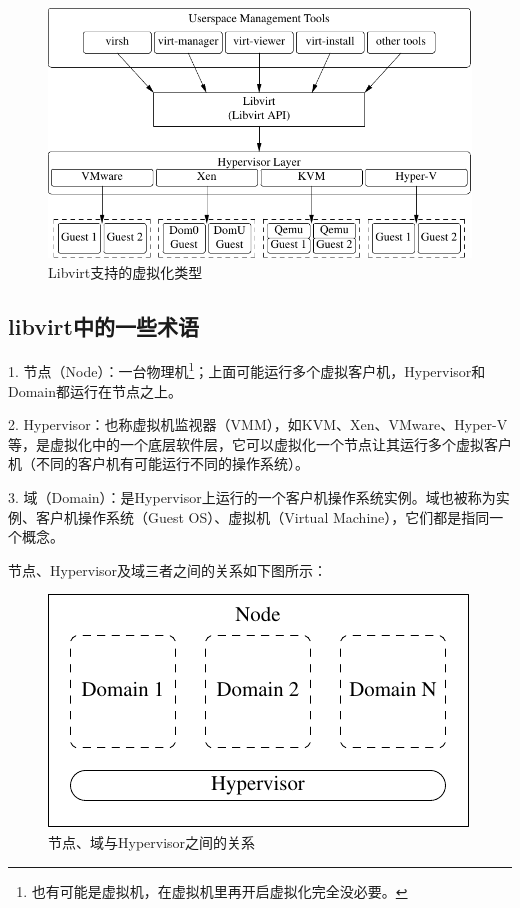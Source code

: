 \begin{figure}[ht]
  \centering
  \includegraphics{graph/libvirt_support.pdf}
  \caption{\label{fig:libvirtSupport} Libvirt支持的虚拟化类型}
\end{figure}

\subsection{libvirt中的一些术语}
\label{sec:libvirtTerm}

1. 节点（Node）：一台物理机\footnote{也有可能是虚拟机，在虚拟机里再开启虚拟化完全没必要。}；上面可能运行多个虚拟客户机，Hypervisor和Domain都运行在节点之上。

2. Hypervisor：也称虚拟机监视器（VMM），如KVM、Xen、VMware、Hyper-V等，是虚拟化中的一个底层软件层，它可以虚拟化一个节点让其运行多个虚拟客户机（不同的客户机有可能运行不同的操作系统）。

3. 域（Domain）：是Hypervisor上运行的一个客户机操作系统实例。域也被称为实例、客户机操作系统（Guest OS）、虚拟机（Virtual Machine），它们都是指同一个概念。

节点、Hypervisor及域三者之间的关系如下图所示：

\begin{figure}[htbp]
  \centering
  \includegraphics{graph/libvirt_node_hypervisor_domain.pdf}
  \caption{\label{fig:libvirtNodeHyperDomain} 节点、域与Hypervisor之间的关系}
\end{figure}

